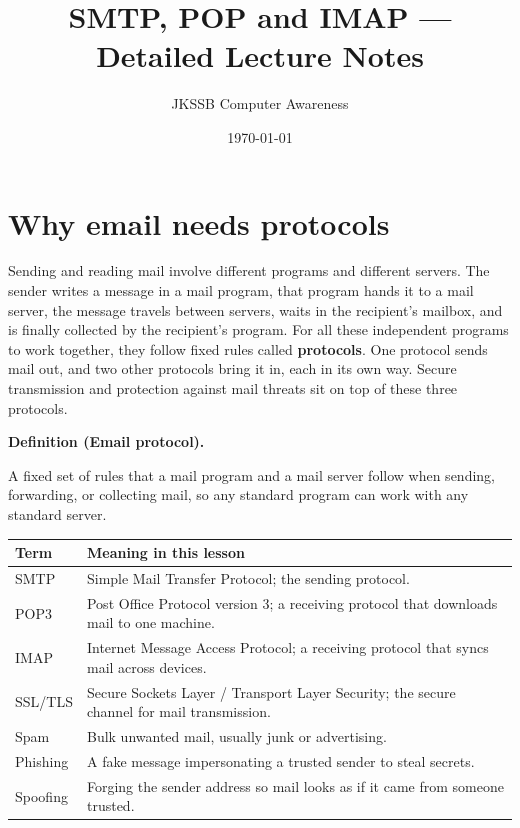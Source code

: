 \documentclass[11pt]{article}
\title{SMTP, POP and IMAP --- Detailed Lecture Notes}
\author{JKSSB Computer Awareness}
\date{\today}
\newenvironment{definitionbox}[1]{%
  \par\noindent\textbf{Definition (#1).}\ \itshape
}{\par\vspace{0.3em}}
\begin{document}
\maketitle

\section{Why email needs protocols}
Sending and reading mail involve different programs and different servers.
The sender writes a message in a mail program, that program hands it to a
mail server, the message travels between servers, waits in the recipient's
mailbox, and is finally collected by the recipient's program. For all these
independent programs to work together, they follow fixed rules called
\textbf{protocols}. One protocol sends mail out, and two other protocols
bring it in, each in its own way. Secure transmission and protection against
mail threats sit on top of these three protocols.

\begin{definitionbox}{Email protocol}
A fixed set of rules that a mail program and a mail server follow when
sending, forwarding, or collecting mail, so any standard program can work
with any standard server.
\end{definitionbox}

\begin{center}
\begin{tabular}{p{}p{}}
\toprule
\textbf{Term} & \textbf{Meaning in this lesson} \\
\midrule
SMTP & Simple Mail Transfer Protocol; the sending protocol. \\
POP3 & Post Office Protocol version 3; a receiving protocol that downloads mail to one machine. \\
IMAP & Internet Message Access Protocol; a receiving protocol that syncs mail across devices. \\
SSL/TLS & Secure Sockets Layer / Transport Layer Security; the secure channel for mail transmission. \\
Spam & Bulk unwanted mail, usually junk or advertising. \\
Phishing & A fake message impersonating a trusted sender to steal secrets. \\
Spoofing & Forging the sender address so mail looks as if it came from someone trusted. \\
\bottomrule
\end{tabular}
\end{center}
\end{document}
